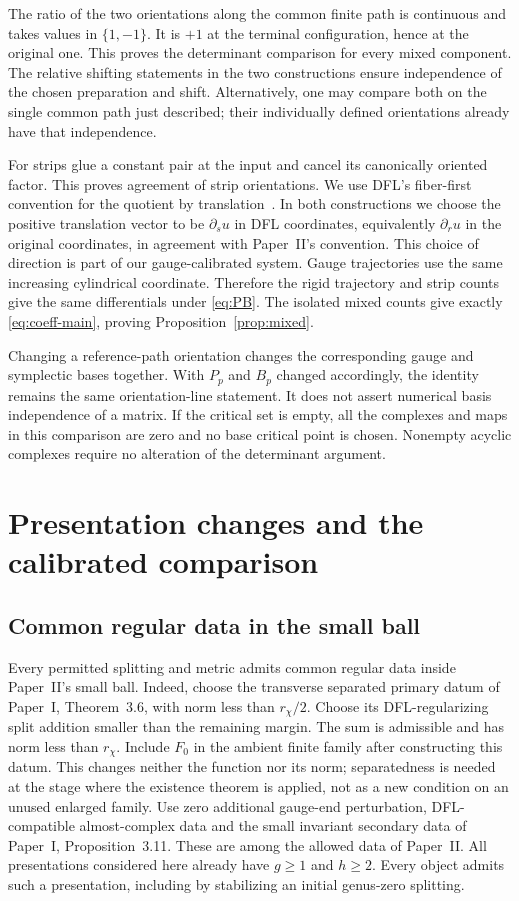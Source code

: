 \documentclass[11pt]{amsart}
\theoremstyle{definition}
\theoremstyle{remark}
\theoremstyle{plain}
\begin{document}
The ratio of the two orientations along the common finite path
is continuous and takes values in $\{1,-1\}$. It is $+1$ at the
terminal configuration, hence at the original one. This proves
the determinant comparison for every mixed component. The
relative shifting statements in the two constructions ensure
independence of the chosen preparation and shift. Alternatively,
one may compare both on the single common path just described;
their individually defined orientations already have that
independence.

For strips glue a constant pair at the input and cancel its
canonically oriented factor. This proves agreement of strip
orientations. We use DFL's fiber-first convention for the quotient
by translation~\cite[p.~17]{DFL}. In both constructions we choose
the positive translation vector to be $\partial_su$ in DFL
coordinates, equivalently $\partial_ru$ in the original coordinates,
in agreement with Paper~II's convention. This choice of direction
is part of our gauge-calibrated system. Gauge trajectories use
the same increasing cylindrical coordinate. Therefore the rigid
trajectory and strip counts give the same differentials under
\eqref{eq:PB}. The isolated mixed counts give exactly
\eqref{eq:coeff-main}, proving Proposition~\ref{prop:mixed}.

Changing a reference-path orientation changes the corresponding
gauge and symplectic bases together. With $P_p$ and $B_p$ changed
accordingly, the identity remains the same orientation-line
statement. It does not assert numerical basis independence of
a matrix. If the critical set is empty, all the complexes and
maps in this comparison are zero and no base critical point is
chosen. Nonempty acyclic complexes require no alteration of
the determinant argument.

\section{Presentation changes and the calibrated comparison}\label{sec:extension}

\subsection{Common regular data in the small ball}
Every permitted splitting and metric admits common regular data
inside Paper~II's small ball. Indeed, choose the transverse
separated primary datum of Paper~I, Theorem~3.6, with norm less
than $r_\chi/2$. Choose its DFL-regularizing split addition
smaller than the remaining margin. The sum is admissible and
has norm less than $r_\chi$. Include $F_0$ in the ambient finite
family after constructing this datum. This changes neither the
function nor its norm; separatedness is needed at the stage
where the existence theorem is applied, not as a new condition
on an unused enlarged family. Use zero additional gauge-end
perturbation, DFL-compatible almost-complex data and the small
invariant secondary data of Paper~I, Proposition~3.11. These
are among the allowed data of Paper~II. All presentations considered
here already have $g\ge1$ and $h\ge2$. Every object admits such a
presentation, including by stabilizing an initial genus-zero splitting.
\end{document}
